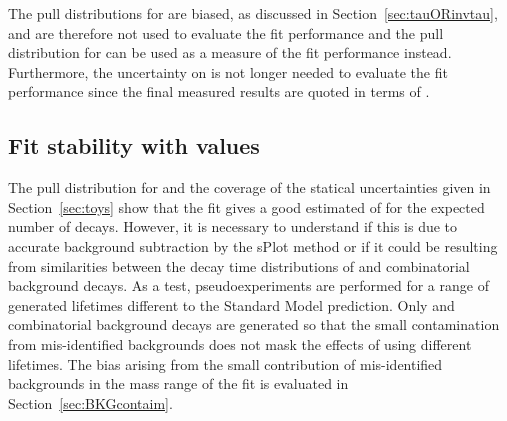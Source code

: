 The pull distributions for \tmumu are biased, as discussed in Section~\ref{sec:tauORinvtau}, and are therefore not used to evaluate the fit performance and the pull distribution for \Gmumu can be used as a measure of the fit performance instead. Furthermore, the uncertainty on \Gmumu is not longer needed to evaluate the fit performance since the final measured results are quoted in terms of \tmumu. %

\subsection{Fit stability with \tmumu values}

The pull distribution for \Gmumu and the coverage of the statical uncertainties given in Section~\ref{sec:toys} show that the fit gives a good estimated of \tmumu for the expected number of decays. However, it is necessary to understand if this is due to accurate background subtraction by the sPlot method or if it could be resulting from similarities between the decay time distributions of \bsmumu and combinatorial background decays. As a test, pseudoexperiments are performed for a range of generated \bsmumu lifetimes different to the Standard Model prediction. Only \bsmumu and combinatorial background decays are generated so that the small contamination from mis-identified backgrounds does not mask the effects of using different lifetimes. The bias arising from the small contribution of mis-identified backgrounds in the mass range of the fit is evaluated in Section~\ref{sec:BKGcontaim}. 

